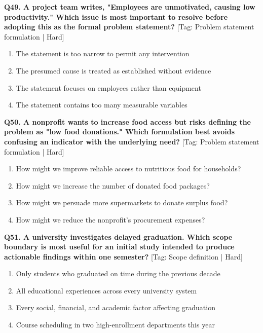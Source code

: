 \noindent\textbf{Q49. A project team writes, "Employees are unmotivated, causing low productivity." Which issue is most important to resolve before adopting this as the formal problem statement?} \hfill [Tag: Problem statement formulation | Hard]
\begin{enumerate}[label=(\alph*),topsep=2pt,itemsep=1pt,partopsep=0pt,parsep=0pt]
    \item {The statement is too narrow to permit any intervention}
    \item {The presumed cause is treated as established without evidence}
    \item {The statement focuses on employees rather than equipment}
    \item {The statement contains too many measurable variables}
\end{enumerate}
\vspace{2mm}

\noindent\textbf{Q50. A nonprofit wants to increase food access but risks defining the problem as "low food donations." Which formulation best avoids confusing an indicator with the underlying need?} \hfill [Tag: Problem statement formulation | Hard]
\begin{enumerate}[label=(\alph*),topsep=2pt,itemsep=1pt,partopsep=0pt,parsep=0pt]
    \item {How might we improve reliable access to nutritious food for households?}
    \item {How might we increase the number of donated food packages?}
    \item {How might we persuade more supermarkets to donate surplus food?}
    \item {How might we reduce the nonprofit's procurement expenses?}
\end{enumerate}
\vspace{2mm}

\noindent\textbf{Q51. A university investigates delayed graduation. Which scope boundary is most useful for an initial study intended to produce actionable findings within one semester?} \hfill [Tag: Scope definition | Hard]
\begin{enumerate}[label=(\alph*),topsep=2pt,itemsep=1pt,partopsep=0pt,parsep=0pt]
    \item {Only students who graduated on time during the previous decade}
    \item {All educational experiences across every university system}
    \item {Every social, financial, and academic factor affecting graduation}
    \item {Course scheduling in two high-enrollment departments this year}
\end{enumerate}
\vspace{2mm}

